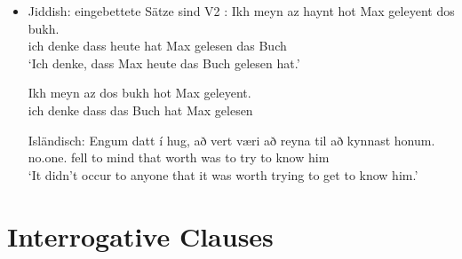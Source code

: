 


\begin{itemize}
\item Jiddish: eingebettete Sätze sind V2 \citep[]{Diesing90a}:
\eal
\ex
\gll Ikh meyn  az   haynt hot Max geleyent dos bukh.\footnotemark\\
     ich   denke dass heute hat Max gelesen   das Buch\\
\glt `Ich denke, dass Max heute das Buch gelesen hat.'

\ex%
\gll Ikh meyn  az   dos bukh hot Max geleyent.\\
     ich denke dass das Buch hat Max gelesen\\

\zl


Isländisch:
\ea 
\gll Engum         datt í hug,  að   vert  væri að reyna til     að kynnast honum.\footnotemark\\
     no.one.\DAT{} fell to mind that worth was  to try   \PREP{} to know    him\\%
{}
\glt `It didn't occur to anyone that it was worth trying to get to know him.'
\z



\end{itemize}





\section{Interrogative Clauses}



